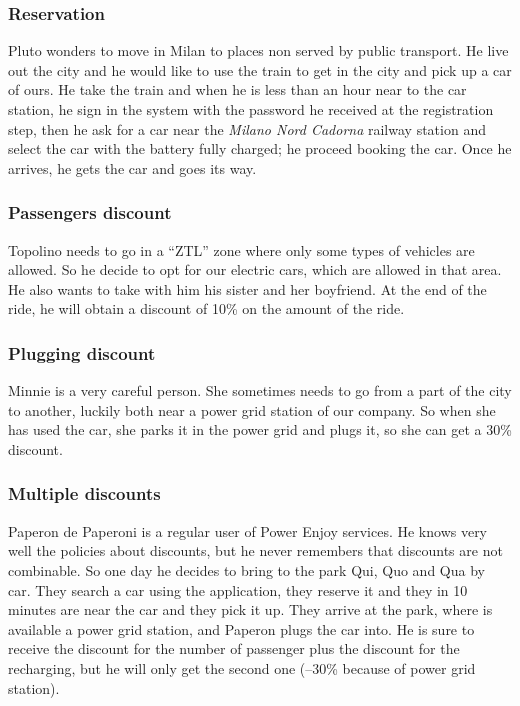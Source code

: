 \documentclass{scrreprt}
\begin{document}
\subsubsection{Reservation}
Pluto wonders to move in Milan to places non served by public transport. He live out the city and he would like to use the train to get in the city and pick up a car of ours. He take the train and when he is less than an hour near to the car station, he sign in the system with the password he received at the registration step, then he ask for a car near the \emph{Milano Nord Cadorna} railway station and select the car with the battery fully charged; he proceed booking the car. Once he arrives, he gets the car and goes its way. %

\subsubsection{Passengers discount}
Topolino needs to go in a “ZTL” zone where only some types of vehicles are allowed. So he decide to opt for our electric cars, which are allowed in that area. He also wants to take with him his sister and her boyfriend. At the end of the ride, he will obtain a discount of 10\% on the amount of the ride.

\subsubsection{Plugging discount}
Minnie is a very careful person. She sometimes needs to go from a part of the city to another, luckily both near a power grid station of our company. So when she has used the car, she parks it in the power grid and plugs it, so she can get a 30\% discount.

\subsubsection{Multiple discounts}
Paperon de Paperoni is a regular user of Power Enjoy services. He knows very well the policies about discounts, but he never remembers that discounts are not combinable. So one day he decides to bring to the park Qui, Quo and Qua by car. They search a car using the application, they reserve it and they in 10 minutes are near the car and they pick it up. They arrive at the park, where is available a power grid station, and Paperon plugs the car into. He is sure to receive the discount for the number of passenger plus the discount for the recharging, but he will only get the second one (--30\% because of power grid station).
\end{document}
